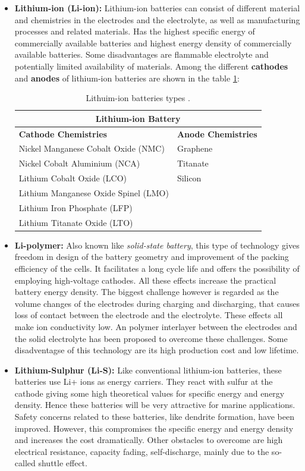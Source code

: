 \begin{itemize}
	\item \textbf{Lithium-ion (Li-ion):} Lithium-ion batteries can consist of different material and chemistries in the electrodes and the electrolyte, as well as manufacturing processes and related materials. Has the highest specific energy of commercially available batteries and highest energy density of commercially available batteries. Some disadvantages are flammable electrolyte and potentially limited availability of materials. Among the different \textbf{cathodes} and \textbf{anodes} of lithium-ion batteries are shown in the table \ref{tab:table1_1}:
	
\begin{table}[H]
\centering
\caption{Lithuim-ion batteries types \cite{EMSA}.}
\label{tab:table1_1}
\begin{tabular}{p{70mm}|m{35mm}}
\hline
\multicolumn{2}{|c|}{\textbf{Lithium-ion Battery}} \\
\hline\hline
\textbf{Cathode Chemistries} & \textbf{Anode Chemistries}    \\
\hline  
Nickel Manganese Cobalt Oxide (NMC) & Graphene \\
Nickel Cobalt Aluminium (NCA) & Titanate \\
Lithium Cobalt Oxide (LCO) & Silicon \\
Lithium Manganese Oxide Spinel (LMO) & \\
Lithium Iron Phosphate (LFP) & \\
Lithium Titanate Oxide (LTO) & \\
\hline \hline
\end{tabular}
\end{table}	
	
		
	\item \textbf{Li-polymer:} Also known like \textit{solid-state battery}, this type of technology gives freedom in design of the battery geometry and improvement of the packing efficiency of the cells. It facilitates a long cycle life and offers the possibility of employing high-voltage cathodes. All these effects increase the practical battery energy density. The biggest challenge however is regarded as the volume changes of the electrodes during charging and discharging, that causes loss of contact between the electrode and the electrolyte. These effects all make ion conductivity low. An polymer interlayer between the electrodes and the solid electrolyte has been proposed to overcome these challenges. Some disadventagse of this technology are its high production cost and low lifetime.
	\item \textbf{Lithium-Sulphur (Li-S):} Like conventional lithium-ion batteries, these batteries use Li+ ions as energy carriers. They react with sulfur at the cathode giving some high theoretical values for specific energy and energy density. Hence these batteries will be very attractive for marine applications.
	Safety concerns related to these batteries, like dendrite formation, have been improved. However, this compromises the specific energy and energy density and increases the cost dramatically. Other obstacles to overcome are high electrical resistance, capacity fading, self-discharge, mainly due to the so-called shuttle effect. 
\end{itemize}

